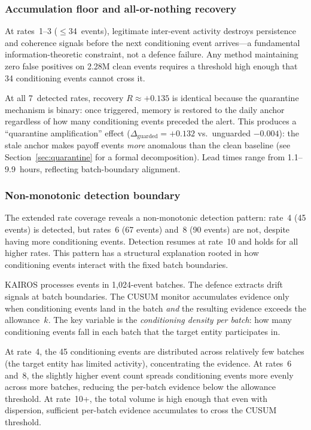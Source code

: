 \documentclass[10pt,twocolumn]{article}
\begin{document}
\subsubsection{Accumulation floor and all-or-nothing recovery}

At rates~1--3 ($\leq$34~events), legitimate inter-event activity destroys
persistence and coherence signals before the next conditioning event
arrives---a fundamental information-theoretic constraint, not a defence
failure.  Any method maintaining zero false positives on 2.28M clean
events requires a threshold high enough that 34 conditioning events
cannot cross it.

At all 7~detected rates, recovery $R \approx +0.135$ is identical
because the quarantine mechanism is binary: once triggered, memory is
restored to the daily anchor regardless of how many conditioning events
preceded the alert.  This produces a ``quarantine amplification'' effect
($\Delta_{\mathrm{guarded}} = +0.132$ vs.\ unguarded $-0.004$): the
stale anchor makes payoff events \emph{more} anomalous than the clean
baseline (see Section~\ref{sec:quarantine} for a formal decomposition).
Lead times range from 1.1--9.9~hours, reflecting batch-boundary
alignment.

\subsubsection{Non-monotonic detection boundary}
\label{sec:nonmono}

The extended rate coverage reveals a non-monotonic detection pattern:
rate~4 (45 events) is detected, but rates~6 (67 events) and~8 (90 events)
are not, despite having more conditioning events.  Detection resumes at
rate~10 and holds for all higher rates.  This pattern has a structural
explanation rooted in how conditioning events interact with the fixed
batch boundaries.

KAIROS processes events in 1,024-event batches.  The defence extracts
drift signals at batch boundaries.  The CUSUM monitor accumulates evidence
only when conditioning events land in the batch \emph{and} the resulting
evidence exceeds the allowance~$k$.  The key variable is the
\emph{conditioning density per batch}: how many conditioning events fall
in each batch that the target entity participates in.

At rate~4, the 45 conditioning events are distributed across relatively few
batches (the target entity has limited activity), concentrating the evidence.
At rates~6 and~8, the slightly higher event count spreads conditioning events
more evenly across more batches, reducing the per-batch evidence below the
allowance threshold.  At rate~10+, the total volume is high enough that even
with dispersion, sufficient per-batch evidence accumulates to cross the
CUSUM threshold.
\end{document}
